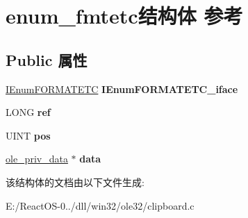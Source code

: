 \hypertarget{structenum__fmtetc}{}\section{enum\+\_\+fmtetc结构体 参考}
\label{structenum__fmtetc}
\subsection*{Public 属性}
\begin{DoxyCompactItemize}
\item 
\mbox{\label{structenum__fmtetc_a1551776704fc10994a502c82fc88f61a}} 
\hyperlink{interface_i_enum_f_o_r_m_a_t_e_t_c}{I\+Enum\+F\+O\+R\+M\+A\+T\+E\+TC} {\bfseries I\+Enum\+F\+O\+R\+M\+A\+T\+E\+T\+C\+\_\+iface}
\item 
\mbox{\label{structenum__fmtetc_a4c211ed425bea22dc1f29a088080ed4a}} 
L\+O\+NG {\bfseries ref}
\item 
\mbox{\label{structenum__fmtetc_a53d33a5c75c60c70ade6d4e1994ca266}} 
U\+I\+NT {\bfseries pos}
\item 
\mbox{\label{structenum__fmtetc_a08a5911acbc5244e196cbaf8543374e1}} 
\hyperlink{structole__priv__data}{ole\+\_\+priv\+\_\+data} $\ast$ {\bfseries data}
\end{DoxyCompactItemize}


该结构体的文档由以下文件生成\+:\begin{DoxyCompactItemize}
\item 
E\+:/\+React\+O\+S-\/0../dll/win32/ole32/clipboard.\+c\end{DoxyCompactItemize}
